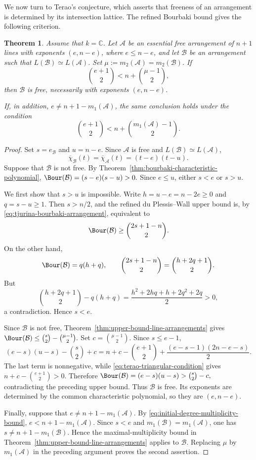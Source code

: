 \documentclass[11pt]{amsart}   %
\newtheorem{Theorem}{Theorem}[section]
\theoremstyle{definition}
\def\NZQ{\mathbb}               %
\def\CC{{\NZQ C}}
\def\A{{\mathcal A}}
\def\B{{\mathcal B}}
\begin{document}
We now turn to Terao's conjecture, which asserts that freeness of an arrangement is determined by its intersection lattice. The refined Bourbaki bound gives the following criterion.

\begin{Theorem}
\label{thm:terao-triangular-criterion}
Assume that $k=\CC$. Let $\A$ be an essential free arrangement of $n+1$ lines with exponents $(e,n-e)$, where $e\leq n-e$, and let $\B$ be an arrangement such that $L(\B)\simeq L(\A)$. Set $\mu:=m_2(\A)=m_2(\B)$. If
\begin{equation}
\label{eq:terao-triangular-condition}
\binom{e+1}{2}
< n+\binom{\mu-1}{2},
\end{equation}
then $\B$ is free, necessarily with exponents $(e,n-e)$.

If, in addition, $e\neq n+1-m_1(\A)$, the same conclusion holds under the condition
\[
\binom{e+1}{2}
< n+\binom{m_1(\A)-1}{2}.
\]
\end{Theorem}

\begin{proof}
Set $s=e_\B$ and $u=n-e$. Since $\A$ is free and $L(\B)\simeq L(\A)$,
\[
\overline{\chi}_\B(t)
=
\overline{\chi}_\A(t)
=
(t-e)(t-u).
\]
Suppose that $\B$ is not free. By Theorem~\ref{thm:bourbaki-characteristic-polynomial}, $\Bour(\B)=(s-e)(s-u)>0.$ Since $e\leq u$, either $s<e$ or $s>u$.

We first show that $s>u$ is impossible. Write $h=u-e=n-2e\geq0$ and $q=s-u\geq1$. Then $s>n/2$, and the refined du Plessis--Wall upper bound is, by \eqref{eq:tjurina-bourbaki-arrangement}, equivalent to
\[
\Bour(\B)\geq\binom{2s+1-n}{2}.
\]
On the other hand,
\[
\Bour(\B)=q(h+q),
\qquad
\binom{2s+1-n}{2}
=
\binom{h+2q+1}{2}.
\]
But
\[
\binom{h+2q+1}{2}-q(h+q)
=
\frac{h^2+2hq+h+2q^2+2q}{2}>0,
\]
a contradiction. Hence $s<e$.

Since $\B$ is not free, Theorem~\ref{thm:upper-bound-line-arrangements} gives $\Bour(\B) \leq \binom s2-\binom{\mu-1}{2}.$ Set $c=\binom{\mu-1}{2}$. Since $s\leq e-1$,
\[
(e-s)(u-s)-\binom s2+c
=
n+c-\binom{e+1}{2} +\frac{(e-s-1)(2n-e-s)}{2}.
\]
The last term is nonnegative, while \eqref{eq:terao-triangular-condition} gives $n+c-\binom{e+1}{2}>0$. Therefore $\Bour(\B)=(e-s)(u-s)>\binom s2-c,$ contradicting the preceding upper bound. Thus $\B$ is free. Its exponents are determined by the common characteristic polynomial, so they are $(e,n-e)$.

Finally, suppose that $e\neq n+1-m_1(\A)$. By \eqref{eq:initial-degree-multiplicity-bound}, $e<n+1-m_1(\A)$. Since $s<e$ and $m_1(\B)=m_1(\A)$, one has $s\neq n+1-m_1(\B)$. Hence the maximal-multiplicity bound in Theorem~\ref{thm:upper-bound-line-arrangements} applies to $\B$. Replacing $\mu$ by $m_1(\A)$ in the preceding argument proves the second assertion.
\end{proof}
\end{document}
